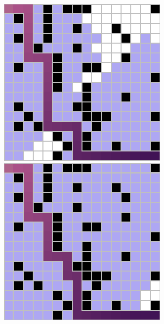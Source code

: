 \documentclass[letter]{article}
\begin{document}
\begin{questions}
	\begin{figure}
		\includegraphics[width=\linewidth]{../pics/16/BFS BDBFS 3528 31 2468.png}
		\caption{}\label{fig:q2-13}
		\endminipage\hfill
		\includegraphics[width=\linewidth]{../pics/16/BFS quickGoal 93752 31 19956.png}

\end{figure}
\end{questions}
\end{document}
